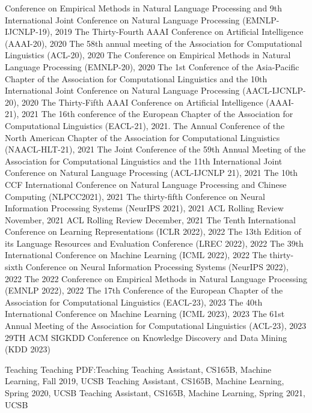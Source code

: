 \documentclass[letterpaper,MMMyyyy,nonstopmode]{simpleresumecv}
\begin{document}
\begin{Body}
    \BulletItem Conference on Empirical Methods in Natural Language Processing and 9th International Joint Conference on Natural Language Processing (EMNLP-IJCNLP-19), 2019
    \BulletItem The Thirty-Fourth AAAI Conference on Artificial Intelligence (AAAI-20), 2020
    \BulletItem The 58th annual meeting of the Association for Computational Linguistics (ACL-20), 2020
    \BulletItem The Conference on Empirical Methods in Natural Language Processing (EMNLP-20), 2020
    \BulletItem The 1st Conference of the Asia-Pacific Chapter of the Association for Computational Linguistics and the 10th International Joint Conference on Natural Language Processing (AACL-IJCNLP-20), 2020
    \BulletItem The Thirty-Fifth AAAI Conference on Artificial Intelligence (AAAI-21), 2021
    \BulletItem The 16th conference of the European Chapter of the Association for Computational Linguistics (EACL-21), 2021. 
    \BulletItem The Annual Conference of the North American Chapter of the Association for Computational Linguistics (NAACL-HLT-21), 2021
    \BulletItem The Joint Conference of the 59th Annual Meeting of the Association for Computational Linguistics and the 11th International Joint Conference on Natural Language Processing (ACL-IJCNLP 21), 2021
    \BulletItem The 10th CCF International Conference on Natural Language Processing and Chinese Computing (NLPCC2021), 2021
    \BulletItem The thirty-fifth Conference on Neural Information Processing Systems (NeurIPS 2021), 2021
    \BulletItem ACL Rolling Review November, 2021
    \BulletItem ACL Rolling Review December, 2021
    \BulletItem The Tenth International Conference on Learning Representations (ICLR 2022), 2022
    \BulletItem The 13th Edition of its Language Resources and Evaluation Conference (LREC 2022), 2022
    \BulletItem The 39th International Conference on Machine Learning (ICML 2022), 2022
    \BulletItem The thirty-sixth Conference on Neural Information Processing Systems (NeurIPS 2022), 2022
    \BulletItem The 2022 Conference on Empirical Methods in Natural Language Processing (EMNLP 2022), 2022
    \BulletItem The 17th Conference of the European Chapter of the Association for Computational Linguistics (EACL-23), 2023
    \BulletItem The 40th International Conference on Machine Learning (ICML 2023), 2023
    \BulletItem The 61st Annual Meeting of the Association for Computational Linguistics (ACL-23), 2023
    \BulletItem 29TH ACM SIGKDD Conference on Knowledge Discovery and Data Mining (KDD 2023)

\Section
{Teaching}
{Teaching}
{PDF:Teaching}
\BulletItem Teaching Assistant, CS165B, Machine Learning, Fall 2019, UCSB
\BulletItem Teaching Assistant, CS165B, Machine Learning, Spring 2020, UCSB
\BulletItem Teaching Assistant, CS165B, Machine Learning, Spring 2021, UCSB


\end{Body}
\end{document}
